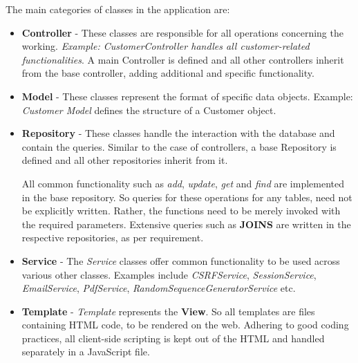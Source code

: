 The main categories of classes in the application are: 
\begin{itemize}
\item \textbf{Controller} - These classes are responsible for all operations concerning the working. \textit{Example: CustomerController handles all customer-related functionalities}. A main Controller is defined and all other controllers inherit from the base controller, adding additional and specific functionality.

\item \textbf{Model} - These classes represent the format of specific data objects. Example: \textit{Customer Model} defines the structure of a Customer object.

\item \textbf{Repository} - These classes handle the interaction with the database and contain the queries. Similar to the case of controllers, a base Repository is defined and all other repositories inherit from it.

All common functionality such as \textit{add}, \textit{update}, \textit{get} and \textit{find} are implemented in the base repository. So queries for these operations for any tables, need not be explicitly written. Rather, the functions need to be merely  invoked with the required parameters.
Extensive queries such as \textbf{JOINS} are written in the respective repositories, as per requirement.

\item \textbf{Service} - The \textit{Service} classes offer common functionality to be used across various other classes. Examples include \textit{CSRFService}, \textit{SessionService}, \textit{EmailService}, \textit{PdfService}, \textit{RandomSequenceGeneratorService} etc.

\item \textbf{Template} - \textit{Template} represents the \textbf{View}. So all templates are files containing HTML code, to be rendered on the web. Adhering to good coding practices, all client-side scripting is kept out of the HTML and handled separately in a JavaScript file.

\end{itemize}

\clearpage